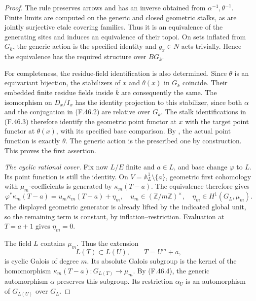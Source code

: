 \documentclass[11pt]{article}
\begin{document}
\begin{proof}
The rule preserves arrows and has an inverse obtained
from \(\alpha^{-1},\theta^{-1}\). Finite limits are
computed on the generic and closed geometric stalks, as
are jointly surjective etale covering families. Thus it
is an equivalence of the generating sites and induces
an equivalence of their topoi. On sets inflated from
\(G_k\), the generic action is the specified identity
and \(g_x\in N\) acts trivially. Hence the equivalence
has the required structure over \(BG_k\).

For completeness, the residue-field identification is
also determined. Since \(\theta\) is an equivariant
bijection, the stabilizers of \(x\) and \(\theta(x)\)
in \(G_k\) coincide. Their embedded finite residue
fields inside \(\bar k\) are consequently the same.
The isomorphism on \(D_x/I_x\) has the identity
projection to this stabilizer, since both \(\alpha\)
and the conjugation in (F.46.2) are relative over
\(G_k\). The stalk identifications in (F.46.3)
therefore identify the geometric point functor at \(x\)
with the target point functor at \(\theta(x)\), with
its specified base comparison. By
\citet[Proposition~3.6]{FF_CHW2024}, the actual point
function is exactly \(\theta\). The generic action
is the prescribed one by construction. This proves the
first assertion.

\emph{The cyclic rational cover.}
Fix now \(L/E\) finite and \(a\in L\), and base
change \(\varphi\) to \(L\). Its point function is
still the identity. On
\(V=\mathbb A^1_L\setminus\{a\}\), geometric first
cohomology with \(\mu_m\)-coefficients is generated
by \(\kappa_m(T-a)\). The equivalence therefore gives
\[
 \varphi^*\kappa_m(T-a)
       =u_m\kappa_m(T-a)+\eta_m,
 \quad u_m\in(\mathbb Z/m\mathbb Z)^\times,
 \quad\eta_m\in H^1(G_L,\mu_m).
                                                        \tag{F.46.4}
\]
The displayed geometric generator is already lifted by
the indicated global unit, so the remaining term is
constant, by inflation--restriction. Evaluation at
\(T=a+1\) gives \(\eta_m=0\).

The field \(L\) contains \(\mu_m\). Thus the
extension
\[
              L(T)\subset L(U),\qquad T=U^m+a,
                                                        \tag{F.46.5}
\]
is cyclic Galois of degree \(m\). Its absolute Galois
subgroup is the kernel of the homomorphism
\(\kappa_m(T-a):G_{L(T)}\to\mu_m\).
By (F.46.4), the generic automorphism \(\alpha\)
preserves this subgroup. Its restriction
\(\alpha_U\) is an automorphism of \(G_{L(U)}\)
over \(G_L\).


\end{proof}
\end{document}
